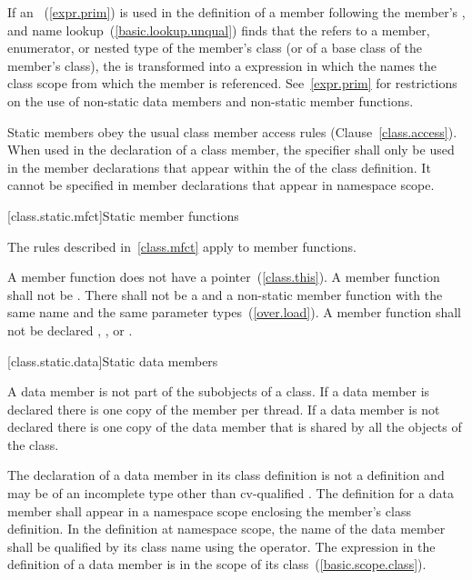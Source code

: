 \pnum
If an ~(\ref{expr.prim}) is used in the
definition of a  member following the member's
, and name lookup~(\ref{basic.lookup.unqual})
finds that the  refers to a 
member, enumerator, or nested type of the member's class (or of a base
class of the member's class), the  is
transformed into a  expression in which the
 names the class scope from which the
member is referenced.
\enternote
See~\ref{expr.prim} for restrictions on the use of non-static data
members and non-static member functions.
\exitnote


\pnum
Static members obey the usual class member access rules
(Clause~\ref{class.access}). When used in the declaration of a class
member, the  specifier shall only be used in the member
declarations that appear within the  of
the class definition.
\enternote
It cannot be specified in member declarations that appear in namespace scope.
\exitnote

[class.static.mfct]{Static member functions}
%

\pnum
\enternote
The rules described in~\ref{class.mfct} apply to  member
functions.
\exitnote

\pnum
\enternote
A  member function does not have a 
pointer~(\ref{class.this}).
\exitnote
A  member function shall not be . There
shall not be a  and a non-static member function with the
same name and the same parameter types~(\ref{over.load}). A
 member function shall not be declared ,
, or .

[class.static.data]{Static data members}
%

\pnum
A  data member is not part of the subobjects of a class. If a
 data member is declared  there is one copy of
the member per thread. If a  data member is not declared
 there is one copy of the data member that is shared by all
the objects of the class.

\pnum
{}%
%
The declaration of a  data member in its class definition
is not a definition and may be of an incomplete type other than
cv-qualified . The definition for a  data
member shall appear in a namespace scope enclosing the member's class
definition.
%
In the definition at namespace scope, the name of the 
data member shall be qualified by its class name using the \tcode{::}
operator. The  expression in the definition of a
 data member is in the scope of its
class~(\ref{basic.scope.class}).
%
\enterexample

